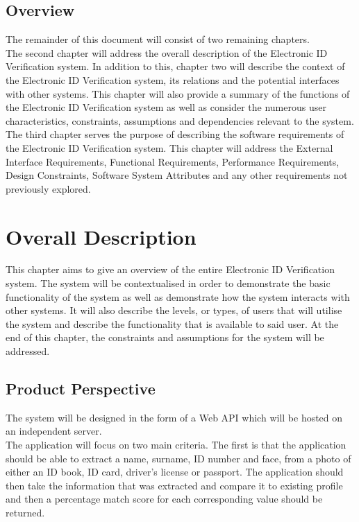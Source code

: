 \documentclass{article}
\def \project{Electronic ID Verification }
\begin{document}
		\subsection{Overview}\label{subsec:overview}
			The remainder of this document will consist of two remaining chapters.\\

            \noindent The second chapter will address the overall description of the \project system. In addition to this, chapter two will describe the context of the \project system, its relations and the potential interfaces with other systems. This chapter will also provide a summary of the functions of the \project system as well as consider the numerous user characteristics, constraints, assumptions and dependencies relevant to the system.\\
            
            \noindent The third chapter serves the purpose of describing the software requirements of the \project system. This chapter will address the External Interface Requirements, Functional Requirements, Performance Requirements, Design Constraints, Software System Attributes and any other requirements not previously explored.\\

	\cleardoublepage

	\section{Overall Description}\label{sec:overall-description}
		This chapter aims to give an overview of the entire \project system. The system will be contextualised in order to demonstrate the basic functionality of the system as well as demonstrate how the system interacts with other systems. It will also describe the levels, or types, of users that will utilise the system and describe the functionality that is available to said user. At the end of this chapter, the constraints and assumptions for the system will be addressed.

		\subsection{Product Perspective}\label{subsec:overall-product-perspective}
		The system will be designed in the form of a Web API which will be hosted on an independent server.\\
		
		 \noindent The application will focus on two main criteria. The first is that the application should be able to extract a name, surname, ID number and face, from a photo of either an ID book, ID card, driver's license or passport. The application should then take the information that was extracted and compare it to existing profile and then a percentage match score for each corresponding value should be returned.\\
		 
\end{document}
